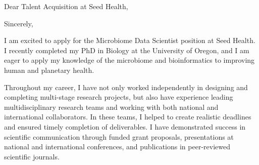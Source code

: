 \documentclass[11pt,letterpaper,sans]{moderncv}        %
\begin{document}
%



\clearpage
\date{March 11, 2023}
\opening{Dear Talent Acquisition at Seed Health,}
\closing{Sincerely,}
\makelettertitle

I am excited to apply for the Microbiome Data Scientist position at Seed Health.
I recently completed my PhD in Biology at the University of Oregon, and I am
eager to apply my knowledge of the microbiome and bioinformatics to improving
human and planetary health.

Throughout my career, I have not only worked independently in designing and
completing multi-stage research projects, but also have experience leading
multidisciplinary research teams and working with both national and
international collaborators. In these teams, I helped to create realistic
deadlines and ensured timely completion of deliverables. I have demonstrated
success in scientific communication through funded grant proposals,
presentations at national and international conferences, and publications in
peer-reviewed scientific journals. 
\end{document}
